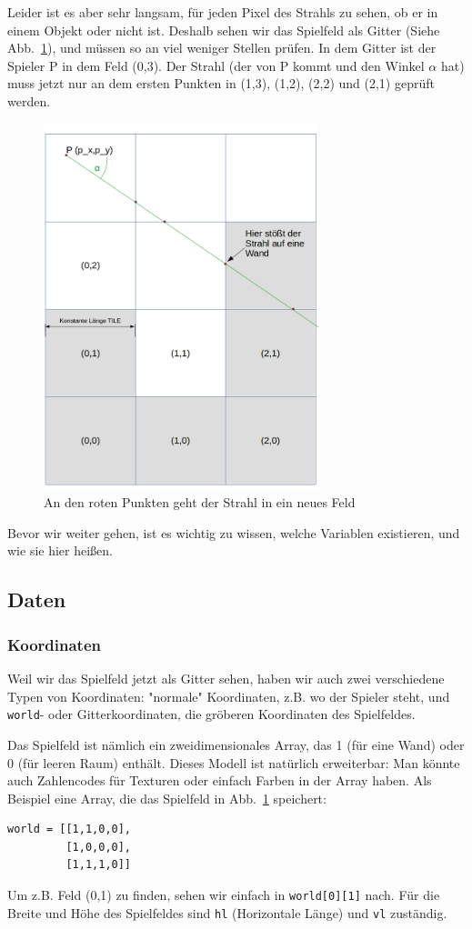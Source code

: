 \documentclass[a4paper,12pt]{report}
\begin{document}
Leider ist es aber sehr langsam, für jeden Pixel des Strahls zu sehen, ob er in einem Objekt oder nicht ist. Deshalb sehen wir das Spielfeld als Gitter (Siehe Abb.~\ref{fig:grid}), und müssen so an viel weniger Stellen prüfen. In dem Gitter ist der Spieler P in dem Feld (0,3). Der Strahl (der von P kommt und den Winkel $\alpha$ hat) muss jetzt nur an dem ersten Punkten in (1,3), (1,2), (2,2) und (2,1) geprüft werden.
\begin{figure}[htbp]
        \centering
        \includegraphics[width=8cm]{grid.png} 
        \caption{An den roten Punkten geht der Strahl in ein neues Feld}
        \label{fig:grid}
\end{figure}

Bevor wir weiter gehen, ist es wichtig zu wissen, welche Variablen existieren, und wie sie hier heißen.

\subsection{Daten}
\subsubsection{Koordinaten}
Weil wir das Spielfeld jetzt als Gitter sehen, haben wir auch zwei verschiedene Typen von Koordinaten: "normale" Koordinaten, z.B. wo der Spieler steht, und \texttt{world}- oder Gitterkoordinaten, die gröberen Koordinaten des Spielfeldes.

Das Spielfeld ist nämlich ein zweidimensionales Array, das 1 (für eine Wand) oder 0 (für leeren Raum) enthält. Dieses Modell ist natürlich erweiterbar: Man könnte auch Zahlencodes für Texturen oder einfach Farben in der Array haben. Als Beispiel eine Array, die das Spielfeld in Abb.~\ref{fig:grid} speichert:
\begin{Verbatim}[baselinestretch=1.0, xleftmargin=1cm]
world = [[1,1,0,0],
         [1,0,0,0],
         [1,1,1,0]]
\end{Verbatim}
Um z.B. Feld (0,1) zu finden, sehen wir einfach in \texttt{world[0][1]} nach. Für die Breite und Höhe des Spielfeldes sind \texttt{hl} (Horizontale Länge) und \texttt{vl} zuständig. 
\end{document}
